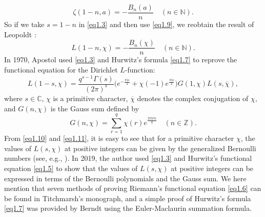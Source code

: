 \documentclass[reqno]{amsart}
\numberwithin{equation}{section}
\begin{document}
\begin{equation}\label{eq1.9}
\zeta(1-n,a)=-\frac{B_{n}(a)}{n}\quad(n\in\mathbb{N}).
\end{equation}
So if we take $s=1-n$ in \eqref{eq1.3} and then use \eqref{eq1.9}, we reobtain the result of Leopoldt \cite{leopoldt}:
\begin{equation}\label{eq1.10}
L(1-n,\chi)=-\frac{B_{n}(\chi)}{n}\quad(n\in\mathbb{N}).
\end{equation}
In 1970, Apostol \cite{apostol3} used \eqref{eq1.3} and Hurwitz's formula \eqref{eq1.7} to reprove the functional equation for the Dirichlet $L$-function:
\begin{equation}\label{eq1.11}
L(1-s,\chi)=\frac{q^{s-1}\Gamma(s)}{(2\pi)^{s}}\bigl(e^{-\frac{\pi \mathrm{i}s}{2}}+\chi(-1)e^{\frac{\pi \mathrm{i}s}{2}}\bigl)G(1,\chi)L(s,\overline{\chi}),
\end{equation}
where $s\in\mathbb{C}$, $\chi$ is a primitive character, $\overline{\chi}$ denotes the complex conjugation of $\chi$, and $G(n,\chi)$ is the Gauss sum defined by
\begin{equation*}
G(n,\chi)=\sum_{r=1}^{q}\chi(r)e^{\frac{2\pi \mathrm{i}rn}{q}}\quad(n\in\mathbb{Z}).
\end{equation*}
From \eqref{eq1.10} and \eqref{eq1.11}, it is easy to see that for a primitive character $\chi$, the values of $L(s,\chi)$ at positive integers can be given by the generalized
Bernoulli numbers (see, e.g., \cite[pp. 442--443]{neukirch}). In 2019, the author \cite{he1} used \eqref{eq1.3} and Hurwitz's functional equation \eqref{eq1.5} to show that the values of $L(s,\chi)$ at positive integers can be expressed in terms of the Bernoulli polynomials and the Gauss sum. We here mention that seven methods of proving Riemann's functional equation \eqref{eq1.6} can be found in Titchmarsh's \cite{titchmarsh} monograph, and a simple proof of Hurwitz's formula \eqref{eq1.7} was provided by Berndt \cite{berndt1} using the Euler-Maclaurin summation formula.
\end{document}
